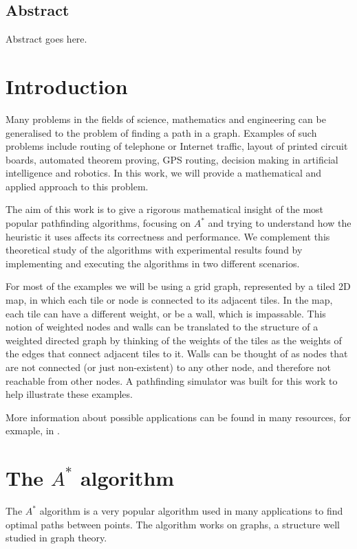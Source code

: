 \documentclass[a4paper,10pt]{report}
\begin{document}
\section*{Abstract}
Abstract goes here.

\tableofcontents

\pagestyle{fancy}
\chapter{Introduction}
Many problems in the fields of science, mathematics and engineering can be generalised to the problem of finding a path in a graph. Examples of such problems include routing of telephone or Internet traffic, layout of printed circuit boards, automated theorem proving, GPS routing, decision making in artificial intelligence and robotics. In this work, we will provide a mathematical and applied approach to this problem.

The aim of this work is to give a rigorous mathematical insight of the most popular pathfinding algorithms, focusing on $A^*$ and trying to understand how the heuristic it uses affects its correctness and performance. We complement this theoretical study of the algorithms with experimental results found by implementing and executing the algorithms in two different scenarios.

For most of the examples we will be using a grid graph, represented by a tiled 2D map, in which each tile or node is connected to its adjacent tiles. In the map, each tile can have a different weight, or be a wall, which is impassable. This notion of weighted nodes and walls can be translated to the structure of a weighted directed graph by thinking of the weights of the tiles as the weights of the edges that connect adjacent tiles to it. Walls can be thought of as nodes that are not connected (or just non-existent) to any other node, and therefore not reachable from other nodes. A pathfinding simulator was built for this work to help illustrate these examples.

More information about possible applications can be found in many resources, for exmaple, in \cite{ai}. %


\chapter{The $A^*$ algorithm}
\label{chapter:algorithms}
The $A^*$ algorithm is a very popular algorithm used in many applications to find optimal paths between points. The algorithm works on graphs, a structure well studied in graph theory.
\end{document}
